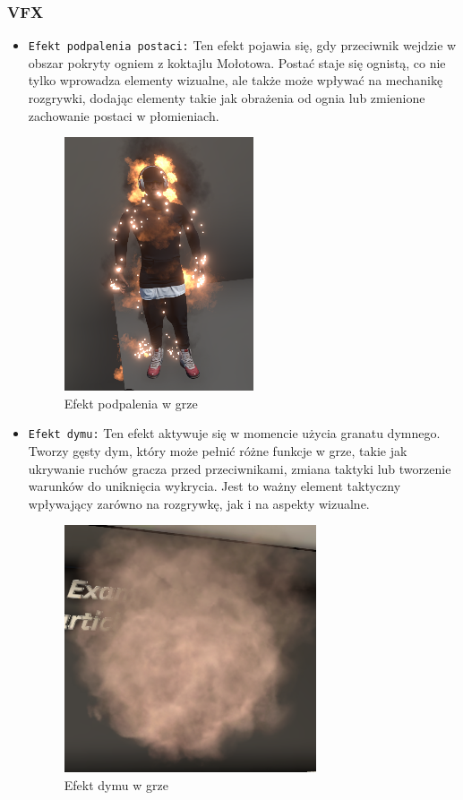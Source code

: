 \subsubsection{VFX}
\begin{itemize}
\item \texttt{Efekt podpalenia postaci:} Ten efekt pojawia się, gdy przeciwnik wejdzie w obszar pokryty ogniem z koktajlu Mołotowa. Postać staje się ognistą, co nie tylko wprowadza elementy wizualne, ale także może wpływać na mechanikę rozgrywki, dodając elementy takie jak obrażenia od ognia lub zmienione zachowanie postaci w płomieniach.
\begin{figure}[h]
    \centering
    \includegraphics[scale=0.7]{Images/onFire.png}
    \caption{Efekt podpalenia w grze}
\end{figure}
\item \texttt{Efekt dymu:} Ten efekt aktywuje się w momencie użycia granatu dymnego. Tworzy gęsty dym, który może pełnić różne funkcje w grze, takie jak ukrywanie ruchów gracza przed przeciwnikami, zmiana taktyki lub tworzenie warunków do uniknięcia wykrycia. Jest to ważny element taktyczny wpływający zarówno na rozgrywkę, jak i na aspekty wizualne.
\begin{figure}[h]
    \centering
    \includegraphics[scale=0.7]{Images/smoke.png}
    \caption{Efekt dymu w grze}
\end{figure}
\FloatBarrier
\end{itemize}